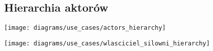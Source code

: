 \subsection{Hierarchia aktorów}\label{subsec:hierarchia-aktorow}

{\texttt{[image: diagrams/use\_cases/actors\_hierarchy]}}

{\texttt{[image: diagrams/use\_cases/wlasciciel\_silowni\_hierarchy]}}